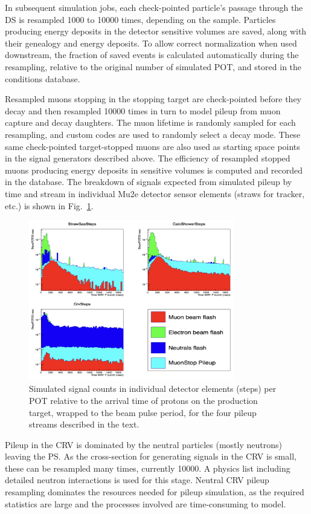 In subsequent simulation jobs, each check-pointed particle's passage through the DS is resampled 1000 to 10000 times, depending on the sample. Particles producing energy deposits in the detector sensitive volumes are saved, along with their genealogy and energy deposits. To allow correct normalization when used downstream, the fraction of saved events is calculated automatically during the resampling, relative to the original number of simulated POT, and stored in the conditions database.

Resampled muons stopping in the stopping target are check-pointed before they decay and then resampled 10000 times in turn to model pileup from muon capture and decay daughters. The muon lifetime is randomly sampled for each resampling, and custom codes are used to randomly select a decay mode. These same check-pointed target-stopped muons are also used as starting space points in the signal generators described above. The efficiency of resampled stopped muons producing energy deposits in sensitive volumes is computed and recorded in the database. 
The breakdown of signals expected from simulated pileup by time and stream in individual Mu2e detector sensor elements (straws for tracker, etc.) is shown in Fig.~\ref{fig:sim_pileup}.

\begin{figure}[ht!]
\centering
\includegraphics[width=0.8\textwidth]{figures/sim_pileup.png}%
\caption{Simulated signal counts in individual detector elements (steps) per POT relative to the arrival time of protons on the production target, wrapped to the beam pulse period, for the four pileup streams described in the text.}
\label{fig:sim_pileup}
\end{figure}

Pileup in the CRV is dominated by the neutral particles (mostly neutrons) leaving the PS. As the cross-section for generating signals in the CRV is small, these can be resampled many times, currently 10000. A physics list including detailed neutron interactions is used for this stage. Neutral CRV pileup resampling dominates the resources needed for pileup simulation, as the required statistics are large and the processes involved are time-consuming to model.

